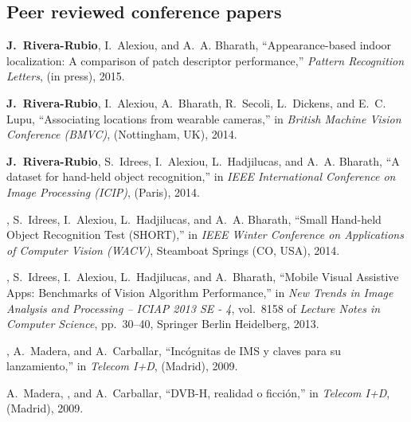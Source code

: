 


\subsection{Peer reviewed conference papers}

\begin{thebibliography}{3}

\textbf{J.~Rivera-Rubio}, I.~Alexiou, and A.~A. Bharath, ``{Appearance-based indoor
  localization: A comparison of patch descriptor performance},'' {\em Pattern
  Recognition Letters}, (in press), 2015.

\textbf{J.~Rivera-Rubio}, I.~Alexiou, A.~Bharath, R.~Secoli, L.~Dickens, and E.~C. Lupu,
  ``{Associating locations from wearable cameras},'' in {\em British Machine
  Vision Conference (BMVC)}, (Nottingham, UK), 2014.


\textbf{J.~Rivera-Rubio}, S.~Idrees, I.~Alexiou, L.~Hadjilucas, and A.~A. Bharath, ``{A
  dataset for hand-held object recognition},'' in {\em IEEE International
  Conference on Image Processing (ICIP)}, (Paris), 2014.

, S.~Idrees, I.~Alexiou, L.~Hadjilucas, and A.~A. Bharath,
  ``{Small Hand-held Object Recognition Test (SHORT)},'' in {\em IEEE Winter
  Conference on Applications of Computer Vision (WACV)}, Steamboat Springs
  (CO, USA), 2014.

, S.~Idrees, I.~Alexiou, L.~Hadjilucas, and A.~Bharath,
  ``{Mobile Visual Assistive Apps: Benchmarks of Vision Algorithm
  Performance},'' in {\em New Trends in Image Analysis and Processing -- ICIAP
  2013 SE - 4}, vol.~8158 of {\em Lecture Notes in Computer Science},
  pp.~30--40, Springer Berlin Heidelberg, 2013.

, A.~Madera, and A.~Carballar, ``{Inc\'{o}gnitas de IMS y claves
  para su lanzamiento},'' in {\em Telecom I+D}, (Madrid), 2009.

A.~Madera, , and A.~Carballar, ``{DVB-H, realidad o
  ficci\'{o}n},'' in {\em Telecom I+D}, (Madrid), 2009.
  
\end{thebibliography}

